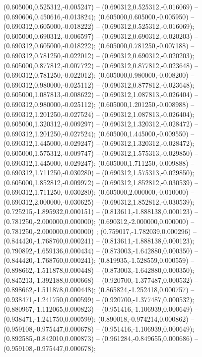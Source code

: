  (0.605000,0.525312,-0.005247) -- (0.690312,0.525312,-0.016069) -- (0.690606,0.450616,-0.013824);
 (0.605000,0.605000,-0.005950) -- (0.690312,0.605000,-0.018222) -- (0.690312,0.525312,-0.016069);
 (0.605000,0.690312,-0.006597) -- (0.690312,0.690312,-0.020203) -- (0.690312,0.605000,-0.018222);
 (0.605000,0.781250,-0.007188) -- (0.690312,0.781250,-0.022012) -- (0.690312,0.690312,-0.020203);
 (0.605000,0.877812,-0.007722) -- (0.690312,0.877812,-0.023648) -- (0.690312,0.781250,-0.022012);
 (0.605000,0.980000,-0.008200) -- (0.690312,0.980000,-0.025112) -- (0.690312,0.877812,-0.023648);
 (0.605000,1.087813,-0.008622) -- (0.690312,1.087813,-0.026404) -- (0.690312,0.980000,-0.025112);
 (0.605000,1.201250,-0.008988) -- (0.690312,1.201250,-0.027524) -- (0.690312,1.087813,-0.026404);
 (0.605000,1.320312,-0.009297) -- (0.690312,1.320312,-0.028472) -- (0.690312,1.201250,-0.027524);
 (0.605000,1.445000,-0.009550) -- (0.690312,1.445000,-0.029247) -- (0.690312,1.320312,-0.028472);
 (0.605000,1.575312,-0.009747) -- (0.690312,1.575313,-0.029850) -- (0.690312,1.445000,-0.029247);
 (0.605000,1.711250,-0.009888) -- (0.690312,1.711250,-0.030280) -- (0.690312,1.575313,-0.029850);
 (0.605000,1.852812,-0.009972) -- (0.690312,1.852812,-0.030539) -- (0.690312,1.711250,-0.030280);
 (0.605000,2.000000,-0.010000) -- (0.690312,2.000000,-0.030625) -- (0.690312,1.852812,-0.030539);
 (0.725215,-1.895932,0.000151) -- (0.813611,-1.888138,0.000123) -- (0.781250,-2.000000,0.000000);
 (0.690312,-2.000000,0.000000) -- (0.781250,-2.000000,0.000000) ;
 (0.759017,-1.782039,0.000296) -- (0.844420,-1.768760,0.000241) -- (0.813611,-1.888138,0.000123);
 (0.790892,-1.659136,0.000434) -- (0.873003,-1.642880,0.000350) -- (0.844420,-1.768760,0.000241);
 (0.819935,-1.528559,0.000559) -- (0.898662,-1.511878,0.000448) -- (0.873003,-1.642880,0.000350);
 (0.845213,-1.392188,0.000668) -- (0.920700,-1.377487,0.000532) -- (0.898662,-1.511878,0.000448);
 (0.865824,-1.252418,0.000757) -- (0.938471,-1.241750,0.000599) -- (0.920700,-1.377487,0.000532);
 (0.880967,-1.112065,0.000823) -- (0.951416,-1.106939,0.000649) -- (0.938471,-1.241750,0.000599);
 (0.890018,-0.974214,0.000862) -- (0.959108,-0.975447,0.000678) -- (0.951416,-1.106939,0.000649);
 (0.892585,-0.842010,0.000873) -- (0.961284,-0.849655,0.000686) -- (0.959108,-0.975447,0.000678);
